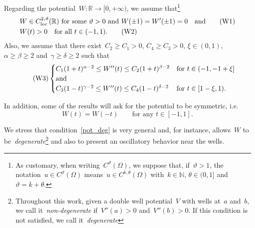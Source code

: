 \documentclass[10pt,a4paper]{amsart}
\numberwithin{equation}{section}
\newcommand{\R}{\mathbb{R}}
\begin{document}
Regarding the potential~$W: \R \to [0,+\infty)$, we assume that\footnote{As customary, when writing~$C^\vartheta(\Omega)$, we suppose that, if~$\vartheta>1$, the notation~$u\in C^\vartheta(\Omega)$ means~$u\in C^{k,\theta}(\Omega)$ with~$k\in\mathbb{N}$, $\theta\in(0,1]$ and~$\vartheta=k+\theta$.} 
   \begin{align}
   &W\in C_{\rm loc}^{2,\vartheta}(\R) \ \mbox{for some~$\vartheta>0$ and} \  W(\pm1)=W\rq{}(\pm1)=0 \quad\mbox{and} \label{pot_reg} \tag{W1}
   \\
   &W(t)>0 \quad \mbox{for all } t \in (-1,1).\label{pot_zero}\tag{W2}
   \end{align}
Also, we assume that there exist~$C_2 \geq C_1 >0$, $C_4\ge C_3>0$,
$\xi \in (0,1)$, $\alpha \geq \beta \geq 2$ and~$\gamma \geq \delta \geq 2$ such that
   \begin{equation}\label{pot_deg}\tag{W3}
      \begin{cases}
       C_1 (1+t)^{\alpha-2} \leq W\rq{}\rq{}(t) \leq C_2 (1+t)^{\beta-2}& \text{for } t \in (-1,-1+\xi] \\ \mbox{and} \\
        C_3 (1-t)^{\gamma-2} \leq W\rq{}\rq{}(t) \leq C_4 (1-t)^{\delta-2} & \text{for } t  \in [1-\xi,1). 
   \end{cases}   
\end{equation}
   
In addition, some of the results will ask for the potential to be symmetric, i.e.
\begin{equation}\label{pot_symm}\tag{W4}
W(t)= W(-t) \qquad\mbox{for any } t \in [-1,1].
\end{equation}

We stress that condition~\eqref{pot_deg} is very general and, for instance, allows~$W$ to be~\textit{degenerate}\footnote{Throughout this work, given a double well potential~$V$ with wells at~$a$ and~$b$, we call it~\textit{non-degenerate} if~$V''(a)>0$ and~$V''(b)>0$. If this condition is not satisfied, we call it~\textit{degenerate}} and also to present an oscillatory behavior near the wells.
\end{document}
